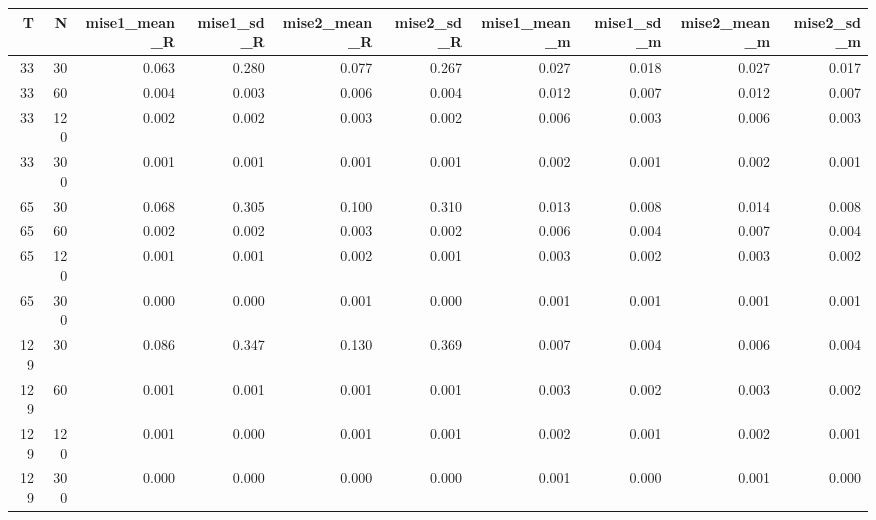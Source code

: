 \begin{table}[ht]
\centering
\begin{tabular}{rrrrrrrrrr}
  \hline
T & N & mise1\_mean\_R & mise1\_sd\_R & mise2\_mean\_R & mise2\_sd\_R & mise1\_mean\_m & mise1\_sd\_m & mise2\_mean\_m & mise2\_sd\_m \\ 
  \hline
33 & 30 & 0.063 & 0.280 & 0.077 & 0.267 & 0.027 & 0.018 & 0.027 & 0.017 \\ 
  33 & 60 & 0.004 & 0.003 & 0.006 & 0.004 & 0.012 & 0.007 & 0.012 & 0.007 \\ 
  33 & 120 & 0.002 & 0.002 & 0.003 & 0.002 & 0.006 & 0.003 & 0.006 & 0.003 \\ 
  33 & 300 & 0.001 & 0.001 & 0.001 & 0.001 & 0.002 & 0.001 & 0.002 & 0.001 \\ 
  65 & 30 & 0.068 & 0.305 & 0.100 & 0.310 & 0.013 & 0.008 & 0.014 & 0.008 \\ 
  65 & 60 & 0.002 & 0.002 & 0.003 & 0.002 & 0.006 & 0.004 & 0.007 & 0.004 \\ 
  65 & 120 & 0.001 & 0.001 & 0.002 & 0.001 & 0.003 & 0.002 & 0.003 & 0.002 \\ 
  65 & 300 & 0.000 & 0.000 & 0.001 & 0.000 & 0.001 & 0.001 & 0.001 & 0.001 \\ 
  129 & 30 & 0.086 & 0.347 & 0.130 & 0.369 & 0.007 & 0.004 & 0.006 & 0.004 \\ 
  129 & 60 & 0.001 & 0.001 & 0.001 & 0.001 & 0.003 & 0.002 & 0.003 & 0.002 \\ 
  129 & 120 & 0.001 & 0.000 & 0.001 & 0.001 & 0.002 & 0.001 & 0.002 & 0.001 \\ 
  129 & 300 & 0.000 & 0.000 & 0.000 & 0.000 & 0.001 & 0.000 & 0.001 & 0.000 \\ 
   \hline
\end{tabular}
\end{table}
